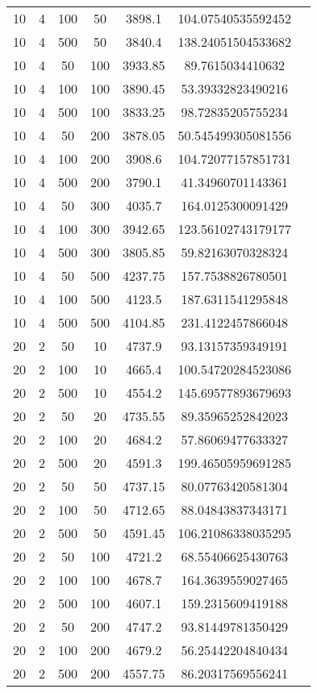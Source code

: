 {\begin{longtabu}{S
S
S
S
S
S[round-mode=places, round-precision=0]
S[round-mode=places, round-precision=0]}
10 & 4 & 100 & 50 & 3898.1 & 104.07540535592452 \\
10 & 4 & 500 & 50 & 3840.4 & 138.24051504533682 \\
10 & 4 & 50 & 100 & 3933.85 & 89.7615034410632 \\
10 & 4 & 100 & 100 & 3890.45 & 53.39332823490216 \\
10 & 4 & 500 & 100 & 3833.25 & 98.72835205755234 \\
10 & 4 & 50 & 200 & 3878.05 & 50.545499305081556 \\
10 & 4 & 100 & 200 & 3908.6 & 104.72077157851731 \\
10 & 4 & 500 & 200 & 3790.1 & 41.34960701143361 \\
10 & 4 & 50 & 300 & 4035.7 & 164.0125300091429 \\
10 & 4 & 100 & 300 & 3942.65 & 123.56102743179177 \\
10 & 4 & 500 & 300 & 3805.85 & 59.82163070328324 \\
10 & 4 & 50 & 500 & 4237.75 & 157.7538826780501 \\
10 & 4 & 100 & 500 & 4123.5 & 187.6311541295848 \\
10 & 4 & 500 & 500 & 4104.85 & 231.4122457866048 \\
20 & 2 & 50 & 10 & 4737.9 & 93.13157359349191 \\
20 & 2 & 100 & 10 & 4665.4 & 100.54720284523086 \\
20 & 2 & 500 & 10 & 4554.2 & 145.69577893679693 \\
20 & 2 & 50 & 20 & 4735.55 & 89.35965252842023 \\
20 & 2 & 100 & 20 & 4684.2 & 57.86069477633327 \\
20 & 2 & 500 & 20 & 4591.3 & 199.46505959691285 \\
20 & 2 & 50 & 50 & 4737.15 & 80.07763420581304 \\
20 & 2 & 100 & 50 & 4712.65 & 88.04843837343171 \\
20 & 2 & 500 & 50 & 4591.45 & 106.21086338035295 \\
20 & 2 & 50 & 100 & 4721.2 & 68.55406625430763 \\
20 & 2 & 100 & 100 & 4678.7 & 164.3639559027465 \\
20 & 2 & 500 & 100 & 4607.1 & 159.2315609419188 \\
20 & 2 & 50 & 200 & 4747.2 & 93.81449781350429 \\
20 & 2 & 100 & 200 & 4679.2 & 56.25442204840434 \\
20 & 2 & 500 & 200 & 4557.75 & 86.20317569556241 \\

\end{longtabu}}
